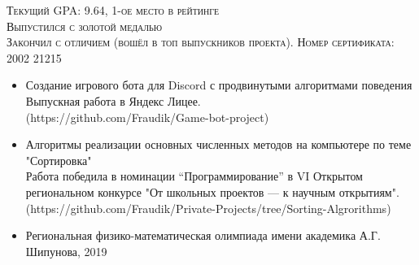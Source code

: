 \documentclass[10pt,a4paper]{altacv}
\begin{document}
\tagline{}

\begin{fullwidth}
\makecvheader
\end{fullwidth}


\textsc{Текущий GPA: 9.64, 1-ое место в рейтинге}
\\
\vspace{10pt}
\textsc{Выпустился с золотой медалью}
\\
\vspace{10pt}
\textsc{Закончил с отличием (вошёл в топ выпускников проекта). Номер сертификата: 2002 21215}
\\
\vspace{10pt}
\textsc{}


\begin{itemize}
\item Создание игрового бота для Discord с продвинутыми алгоритмами поведения \\
Выпускная работа в Яндекс Лицее. \\
(https://github.com/Fraudik/Game-bot-project)
\item Алгоритмы реализации основных численных методов на компьютере по теме "Сортировка" \\ Работа победила в номинации “Программирование” в VI Открытом региональном конкурсе "От школьных проектов --- к научным открытиям". \\
(https://github.com/Fraudik/Private-Projects/tree/Sorting-Algrorithms)
\end{itemize}

\begin{itemize}
\item Региональная физико-математическая олимпиада имени академика А.Г. Шипунова, 2019
\end{itemize}

\clearpage
\end{document}
